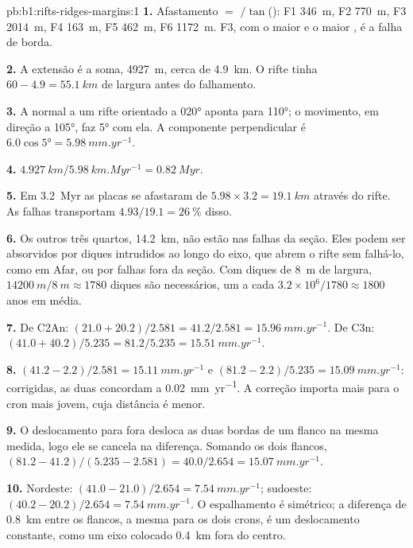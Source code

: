 \begin{solution}{pb:b1:rifts-ridges-margins:1}
\textbf{1.} Afastamento $= $ $/\tan$(): F1 \qty{346}{m}, F2 \qty{770}{m},
F3 \qty{2014}{m}, F4 \qty{163}{m}, F5 \qty{462}{m}, F6 \qty{1172}{m}. F3, com
o maior  e o maior , é a falha de borda.

\textbf{2.} A extensão é a soma, \qty{4927}{m}, cerca de \qty{4.9}{km}. O
rifte tinha $60 - 4.9 = \qty{55.1}{km}$ de largura antes do falhamento.

\textbf{3.} A normal a um rifte orientado a \ang{020} aponta para \ang{110}; o
movimento, em direção a \ang{105}, faz \ang{5} com ela. A componente perpendicular
é $6.0\cos\ang{5} = \qty{5.98}{mm.yr^{-1}}$.

\textbf{4.} $\qty{4.927}{km}/\qty{5.98}{km.Myr^{-1}} = \qty{0.82}{Myr}$.

\textbf{5.} Em \qty{3.2}{Myr} as placas se afastaram de
$5.98\times3.2 = \qty{19.1}{km}$ através do rifte. As falhas transportam
$4.93/19.1 = \qty{26}{\percent}$ disso.

\textbf{6.} Os outros três quartos, \qty{14.2}{km}, não estão nas falhas da
seção. Eles podem ser absorvidos por diques intrudidos ao longo do eixo, que abrem
o rifte sem falhá-lo, como em Afar, ou por falhas fora da seção.
Com diques de \qty{8}{m} de largura, $\qty{14200}{m}/\qty{8}{m} \approx 1780$ diques são
necessários, um a cada $3.2\times10^6/1780 \approx 1800$ anos em média.

\textbf{7.} De C2An: $(21.0 + 20.2)/2.581 = 41.2/2.581 =
\qty{15.96}{mm.yr^{-1}}$. De C3n: $(41.0 + 40.2)/5.235 = 81.2/5.235 =
\qty{15.51}{mm.yr^{-1}}$.

\textbf{8.} $(41.2 - 2.2)/2.581 = \qty{15.11}{mm.yr^{-1}}$ e
$(81.2 - 2.2)/5.235 = \qty{15.09}{mm.yr^{-1}}$: corrigidas, as duas concordam a
\qty{0.02}{mm.yr^{-1}}. A correção importa mais para o cron mais jovem, cuja
distância é menor.

\textbf{9.} O deslocamento para fora desloca as duas bordas de um flanco na mesma
medida, logo ele se cancela na diferença. Somando os dois flancos,
$(81.2 - 41.2)/(5.235 - 2.581) = 40.0/2.654 = \qty{15.07}{mm.yr^{-1}}$.

\textbf{10.} Nordeste: $(41.0 - 21.0)/2.654 = \qty{7.54}{mm.yr^{-1}}$;
sudoeste: $(40.2 - 20.2)/2.654 = \qty{7.54}{mm.yr^{-1}}$. O espalhamento é
simétrico; a diferença de \qty{0.8}{km} entre os flancos, a mesma para os dois
crons, é um deslocamento constante, como um eixo colocado \qty{0.4}{km} fora
do centro.


\end{solution}
